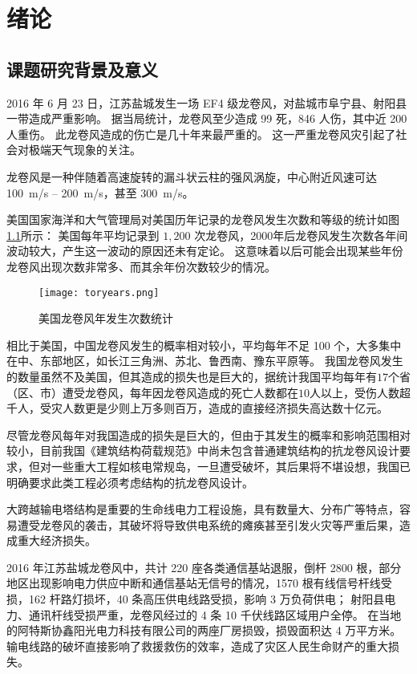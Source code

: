 \graphicspath{{figures/intro/}}

\chapter{绪论}

\section{课题研究背景及意义}

2016 年 6 月 23 日，江苏盐城发生一场 EF4 级龙卷风，对盐城市阜宁县、射阳县一带造成严重影响。
据当局统计，龙卷风至少造成 99 死，846 人伤，其中近 200 人重伤。
此龙卷风造成的伤亡是几十年来最严重的\cite{wiki2016yancheng}。
这一严重龙卷风灾引起了社会对极端天气现象的关注。

龙卷风是一种伴随着高速旋转的漏斗状云柱的强风涡旋，中心附近风速可达 \SI{100}{m/s} -- \SI{200}{m/s}，甚至 \SI{300}{m/s}。

美国国家海洋和大气管理局对美国历年记录的龙卷风发生次数和等级的统计如图\ref{fig:tornado-years}所示\cite{noaa2017tornado}：
美国每年平均记录到 $1,200$ 次龙卷风，2000年后龙卷风发生次数各年间波动较大，产生这一波动的原因还未有定论。
这意味着以后可能会出现某些年份龙卷风出现次数非常多、而其余年份次数较少的情况。

\begin{figure}[!htbp]
    \centering
    \texttt{[image: toryears.png]}
    \caption{美国龙卷风年发生次数统计}
    \label{fig:tornado-years}
\end{figure}

相比于美国，中国龙卷风发生的概率相对较小，平均每年不足 100 个，大多集中在中、东部地区，如长江三角洲、苏北、鲁西南、豫东平原等。
我国龙卷风发生的数量虽然不及美国，但其造成的损失也是巨大的，据统计我国平均每年有$17$个省（区、市）遭受龙卷风，每年因龙卷风造成的死亡人数都在$10$人以上，受伤人数超千人，受灾人数更是少则上万多则百万，造成的直接经济损失高达数十亿元\cite{liu2007chinese}。

尽管龙卷风每年对我国造成的损失是巨大的，但由于其发生的概率和影响范围相对较小，目前我国《建筑结构荷载规范》中尚未包含普通建筑结构的抗龙卷风设计要求，但对一些重大工程如核电常规岛，一旦遭受破坏，其后果将不堪设想，我国已明确要求此类工程必须考虑结构的抗龙卷风设计。

大跨越输电塔结构是重要的生命线电力工程设施，具有数量大、分布广等特点，容易遭受龙卷风的袭击，其破坏将导致供电系统的瘫痪甚至引发火灾等严重后果，造成重大经济损失。

2016 年江苏盐城龙卷风中，共计 220 座各类通信基站退服，倒杆 2800 根，部分地区出现影响电力供应中断和通信基站无信号的情况，1570 根有线信号杆线受损，162 杆路灯损坏，40 条高压供电线路受损，影响 3 万负荷供电；
射阳县电力、通讯杆线受损严重，龙卷风经过的 4 条 10 千伏线路区域用户全停。
在当地的阿特斯协鑫阳光电力科技有限公司的两座厂房损毁，损毁面积达 4 万平方米\cite{thepaper2016yancheng}。
输电线路的破坏直接影响了救援救伤的效率，造成了灾区人民生命财产的重大损失。

